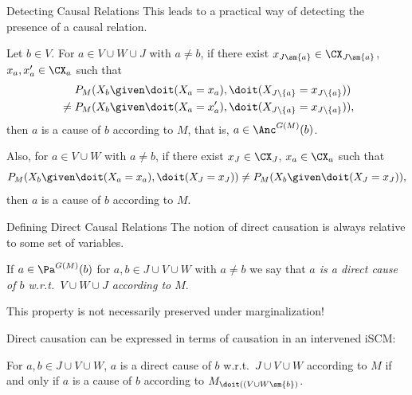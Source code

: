 \begin{frame}{Detecting Causal Relations}
This leads to a practical way of detecting the presence of a causal relation.
  \begin{Cor}[\ref{cor:scm_identify_causal_relation}]
  Let $b \in V$.
  For $a \in V \cup W \cup J$ with $a \ne b$, if
  there exist $x_{J\sm\{a\}} \in \CX_{J\sm\{a\}}$, $x_a,x_a' \in \CX_a$ such that
      \begin{equation*}\begin{split}
        & P_{M}(X_b \given \doit(X_a=x_a),\doit(X_{J\setminus \{a\}}=x_{J\setminus \{a\}})) \\
        {} \ne {} & P_{M}(X_b \given \doit(X_a=x_a'),\doit(X_{J\setminus\{a\}}=x_{J\setminus\{a\}})),
      \end{split}\end{equation*}
  then $a$ is a cause of $b$ according to $M$, that is, $a \in \Anc^{G(M)}(b)$.

  Also, for $a \in V \cup W$ with $a \ne b$, if
  there exist $x_J \in \CX_J$, $x_a \in \CX_a$ such that
  $$P_{M}(X_b \given \doit(X_a=x_a),\doit(X_J=x_J)) \ne P_{M}(X_b \given \doit(X_J=x_J)),$$
  then $a$ is a cause of $b$ according to $M$.  
\end{Cor}
\end{frame}

\begin{frame}{Defining Direct Causal Relations}
The notion of direct causation is always relative to some set of variables.
\begin{Def}[\ref{def:direct_cause_of}]
  If $a \in \Pa^{G(M)}(b)$ for $a, b \in J \cup V \cup W$ with $a\ne b$ we say that \emph{$a$ is a direct cause of $b$ w.r.t.\ $V \cup W \cup J$ according to $M$}.
\end{Def}
This property is not necessarily preserved under marginalization!

\bigskip
Direct causation can be expressed in terms of causation in an intervened iSCM:
\begin{Prp}[\ref{prp:direct_cause_of}]
  For $a,b \in J \cup V \cup W$, $a$ is a direct cause of $b$ w.r.t.\ $J \cup V \cup W$ according to $M$ if and only if $a$ is a cause of $b$ according to $M_{\doit((V \cup W \sm \{b\})}$.
\end{Prp}

\end{frame}

